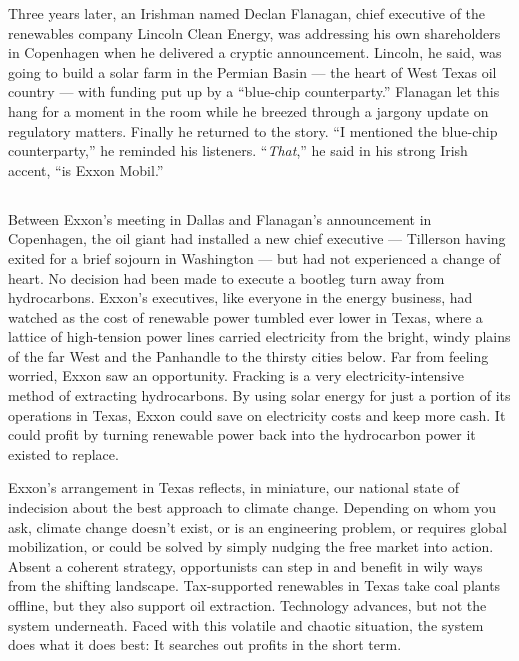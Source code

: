 Three years later, an Irishman named Declan Flanagan, chief executive of
the renewables company Lincoln Clean Energy, was addressing his own
shareholders in Copenhagen when he delivered a cryptic announcement.
Lincoln, he said, was going to build a solar farm in the Permian Basin
--- the heart of West Texas oil country --- with funding put up by a
``blue-chip counterparty.'' Flanagan let this hang for a moment in the
room while he breezed through a jargony update on regulatory matters.
Finally he returned to the story. ``I mentioned the blue-chip
counterparty,'' he reminded his listeners. ``\emph{That},'' he said in
his strong Irish accent, ``is Exxon Mobil.''

\subsection{}

Between Exxon's meeting in Dallas and Flanagan's announcement in
Copenhagen, the oil giant had installed a new chief executive ---
Tillerson having exited for a brief sojourn in Washington --- but had
not experienced a change of heart. No decision had been made to execute
a bootleg turn away from hydrocarbons. Exxon's executives, like everyone
in the energy business, had watched as the cost of renewable power
tumbled ever lower in Texas, where a lattice of high-tension power lines
carried electricity from the bright, windy plains of the far West and
the Panhandle to the thirsty cities below. Far from feeling worried,
Exxon saw an opportunity. Fracking is a very electricity-intensive
method of extracting hydrocarbons. By using solar energy for just a
portion of its operations in Texas, Exxon could save on electricity
costs and keep more cash. It could profit by turning renewable power
back into the hydrocarbon power it existed to replace.

Exxon's arrangement in Texas reflects, in miniature, our national state
of indecision about the best approach to climate change. Depending on
whom you ask, climate change doesn't exist, or is an engineering
problem, or requires global mobilization, or could be solved by simply
nudging the free market into action. Absent a coherent strategy,
opportunists can step in and benefit in wily ways from the shifting
landscape. Tax-supported renewables in Texas take coal plants offline,
but they also support oil extraction. Technology advances, but not the
system underneath. Faced with this volatile and chaotic situation, the
system does what it does best: It searches out profits in the short
term.

